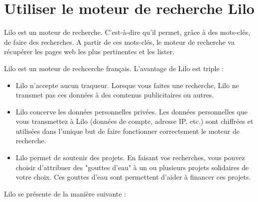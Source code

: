 \documentclass[12pt]{book}
\begin{document}
\section{Utiliser le moteur de recherche Lilo}
	Lilo est un moteur de recherche. 
	C'est-à-dire qu'il permet, grâce à des mots-clés, de faire des recherches.
	A partir de ces mots-clés, le moteur de recherche va récupérer les pages web les plus pertinentes et les lister.\par
	Lilo est un moteur de rechcerche français. L'avantage de Lilo est triple :
	\begin{itemize}
		\item Lilo n'accepte aucun traqueur.\newline
				Lorsque vous faites une recherche, Lilo ne transmet pas ces données à des comtenus publicitaires ou autres.
		\item Lilo concerve les données personnelles privées.\newline
				Les données personnelles que vous transmettez à Lilo (données de compte, adresse IP, etc.) sont chiffrées et utilisées dans l'unique but de faire fonctionner correctement le moteur de recherche.
		\item Lilo permet de soutenir des projets.\newline
				En faisant vos recherches, vous pouvez choisir d'attribuer des "gouttes d'eau" à un ou plusieurs projets solidaires de votre choix.
				Ces gouttes d'eau sont permettent d'aider à financer ces projets.
	\end{itemize}\par
	Lilo se présente de la manière suivante :
\end{document}
